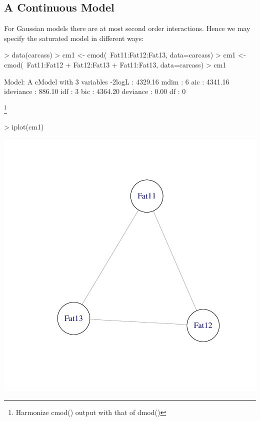 \documentclass[12pt]{article}
\begin{document}
\subsection{A Continuous Model}
\label{sec:xxx}

For Gaussian models there are at most second order interactions. Hence
we may specify the saturated model in different ways:

\begin{Schunk}
\begin{Sinput}
> data(carcass)
> cm1 <- cmod(~Fat11:Fat12:Fat13, data=carcass)
> cm1 <- cmod(~Fat11:Fat12 + Fat12:Fat13 + Fat11:Fat13, data=carcass)
> cm1
\end{Sinput}
\begin{Soutput}
Model: A cModel with 3 variables
 -2logL    :        4329.16 mdim :    6 aic :      4341.16 
 ideviance :         886.10 idf  :    3 bic :      4364.20 
 deviance  :           0.00 df   :    0 
\end{Soutput}
\end{Schunk}

\footnote{Harmonize cmod() output with that of dmod()}

\begin{Schunk}
\begin{Sinput}
> iplot(cm1)
\end{Sinput}
\end{Schunk}
\includegraphics{figures/GRIM-013}
\end{document}

